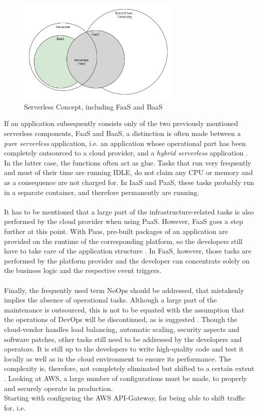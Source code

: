 \documentclass[a4paper,twoside,11pt, pagesize]{scrartcl}
\begin{document}
\begin{spacing}{1.2}
\begin{figure}[H]
\label{fig:serverlessBaaSandPaas}
\centering
\includegraphics[width=0.7\textwidth]{Serverless}
\caption{Serverless Concept, including FaaS and BaaS}
\end{figure} 
If an application subsequently consists only of the two previously mentioned serverless components, FaaS and BaaS, a distinction is often made between a \textit{pure serverless} application, i.e. an application whose operational part has been completely outsourced to a cloud provider, and a \textit{hybrid serverless} application \cite{leitner2019mixed}. In the latter case, the functions often act as glue. Tasks that run very frequently and most of their time are running IDLE, do not claim any CPU or memory and as a consequence are not charged for. In IaaS and PaaS, these tasks probably run in a separate container, and therefore permanently are running.\\\\ It has to be mentioned that a large part of the infrastructure-related tasks is also performed by the cloud provider when using PaaS. However, FaaS goes a step further at this point. With Paas, pre-built packages of an application are provided on the runtime of the corresponding platform, so the developers still have to take care of the application structure \cite{kaplan2019framework}. In FaaS, however, those tasks are performed by the platform provider and the developer can concentrate solely on the business logic and the respective event triggers.\\\\ Finally, the frequently used term \glqq NoOps\grqq{} \cite{fowler2018serverless} should be addressed, that mistakenly implies the absence of operational tasks. Although a large part of the maintenance is outsourced, this is not to be equated with the assumption that the operations of DevOps will be discontinued, as is suggested \cite{fowler2018serverless}.  Though the cloud-vendor handles load balancing, automatic scaling, security aspects and software patches, other tasks still need to be addressed by the developers and operators. It is still up to the developers to write high-quality code and test it locally as well as in the cloud environment to ensure its performance. The complexity is, therefore, not completely eliminated but shifted to a certain extent \cite{eivy2017wary}. Looking at AWS, a large number of configurations must be made, to properly and securely operate in production.\\ Starting with configuring the AWS API-Gateway, for being able to shift traffic for, i.e. 
\end{spacing}
\end{document}
